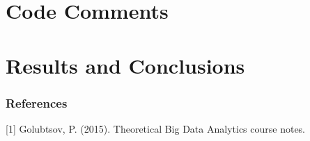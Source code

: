 \documentclass[t]{beamer}
\begin{document}
\section{Code Comments}
\section{Results and Conclusions}
\begin{frame}
\frametitle{References}

[1] Golubtsov, P. (2015). Theoretical Big Data Analytics course notes.

\end{frame}
\end{document}
